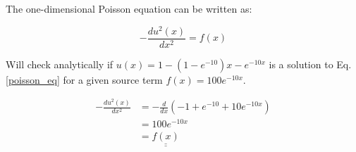 

The one-dimensional Poisson equation can be written as:

\begin{equation}
   -\frac{du^2(x)}{dx^2} = f(x)
    \label{poisson_eq} 
\end{equation}


Will check analytically if $u(x) = 1 - (1 - e^{-10}) x - e^{-10x} $ is a solution to Eq. \ref{poisson_eq} for a given source term $f(x) = 100e^{-10x}$.

\begin{align}
    -\frac{du^2(x)}{dx^2} &= -\frac{d}{dx}(-1 + e^{-10} + 10e^{-10x}) \\
    &= 100e^{-10x} \\
    &= \underline{\underline{f(x)}}
\end{align}